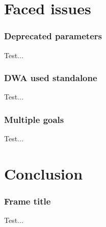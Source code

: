 \documentclass{beamer}
\begin{document}

\section{Faced issues}


\begin{frame}
\frametitle{Deprecated parameters}

Test...

\end{frame}


\begin{frame}
\frametitle{DWA used standalone}

Test...

\end{frame}


\begin{frame}
\frametitle{Multiple goals}

Test...

\end{frame}




\section{Conclusion}


\begin{frame}
\frametitle{Frame title}

Test...

\end{frame}
\end{document}
